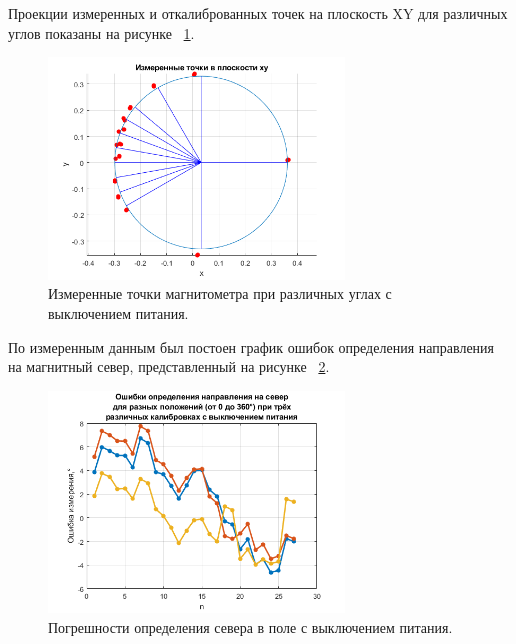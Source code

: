 \documentclass[a4paper,12pt]{article}
\begin{document}
Проекции измеренных и откалиброванных точек на плоскость XY для различных углов показаны на рисунке ~\ref{fig:round_circle}.
\begin{figure}[htb] %
\centering
\includegraphics[width=0.7\textwidth]{PICS/measdots.png} %
\caption{\label{fig:round_circle} Измеренные точки магнитометра при различных углах с выключением питания.} %
\end{figure}

По измеренным данным был постоен график ошибок определения направления на магнитный север, представленный на рисунке ~\ref{fig:errs1}. 

\begin{figure}[htb] %
\centering
\includegraphics[width=0.7\textwidth]{PICS/magn_out_errors5.png} %
\caption{\label{fig:errs1}Погрешности определения севера в поле с выключением питания.} %
\end{figure}
\end{document}
